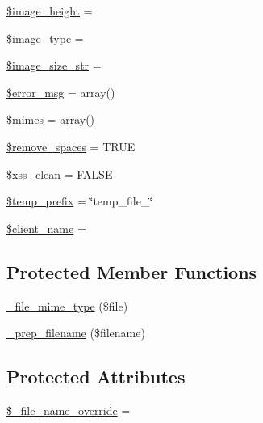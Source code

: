 \begin{DoxyCompactItemize}
\item 
\hyperlink{class_c_i___upload_af1b0485025a4c66fa3b2fc442df02d72}{\$image\+\_\+height} = \textquotesingle{}\textquotesingle{}
\item 
\hyperlink{class_c_i___upload_a939d6733d998cce893403d2f59f40317}{\$image\+\_\+type} = \textquotesingle{}\textquotesingle{}
\item 
\hyperlink{class_c_i___upload_a3a1769072af8ab3b0c5d6e0c1a1ae2ef}{\$image\+\_\+size\+\_\+str} = \textquotesingle{}\textquotesingle{}
\item 
\hyperlink{class_c_i___upload_acf910733622c1fa671b9f755c69c2ec7}{\$error\+\_\+msg} = array()
\item 
\hyperlink{class_c_i___upload_a2ce7d338d1fd0f0d971ba6213ac298a2}{\$mimes} = array()
\item 
\hyperlink{class_c_i___upload_ad9f32a52b4b2c16e42a007e0fa832721}{\$remove\+\_\+spaces} = T\+R\+UE
\item 
\hyperlink{class_c_i___upload_a0f2ee8861c0b3164a5c6e126dd98c0cc}{\$xss\+\_\+clean} = F\+A\+L\+SE
\item 
\hyperlink{class_c_i___upload_ab38888cba65ae75bbc5b3841bc69d64a}{\$temp\+\_\+prefix} = \char`\"{}temp\+\_\+file\+\_\+\char`\"{}
\item 
\hyperlink{class_c_i___upload_a3b81ba4d3535269e20e0b4a2ddab2edc}{\$client\+\_\+name} = \textquotesingle{}\textquotesingle{}
\end{DoxyCompactItemize}
\subsection*{Protected Member Functions}
\begin{DoxyCompactItemize}
\item 
\hyperlink{class_c_i___upload_a8ac4511eca70b271965b7f8ef00faf66}{\+\_\+file\+\_\+mime\+\_\+type} (\$file)
\item 
\hyperlink{class_c_i___upload_a00936ce870d818794909bf16dc2ff70b}{\+\_\+prep\+\_\+filename} (\$filename)
\end{DoxyCompactItemize}
\subsection*{Protected Attributes}
\begin{DoxyCompactItemize}
\item 
\hyperlink{class_c_i___upload_a9f09c7cb693d391de63f9c8e91f159e1}{\$\+\_\+file\+\_\+name\+\_\+override} = \textquotesingle{}\textquotesingle{}
\end{DoxyCompactItemize}


